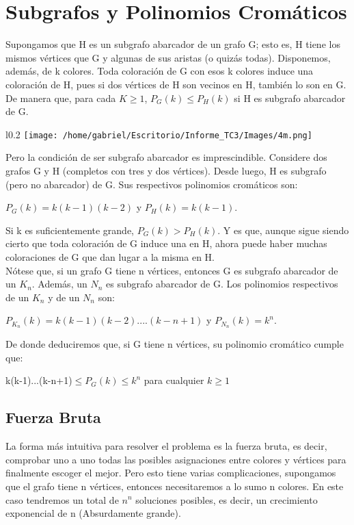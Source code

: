 \documentclass[12pt]{report}
\begin{document}
\section{Subgrafos y Polinomios Cromáticos}
Supongamos que H es un subgrafo abarcador de un grafo G; esto es, H tiene los mismos vértices que G y algunas de sus aristas (o quizás todas). Disponemos, además, de k colores. Toda coloración de G con esos k colores induce una coloración de H, pues si dos vértices de H son vecinos en H, también lo son en G. De manera que, para cada
$K \geq 1$, $P_G(k) \leq P_H(k)$ si H es subgrafo abarcador de G.\\
\begin{wrapfigure}{l}{0.2\linewidth}
    \centering
    \texttt{[image: /home/gabriel/Escritorio/Informe\_TC3/Images/4m.png]}
\end{wrapfigure}
Pero la condición de ser subgrafo abarcador es imprescindible. Considere dos grafos G y H (completos con tres y dos vértices).
Desde luego, H es subgrafo (pero no abarcador) de G. Sus respectivos polinomios cromáticos son:\\
\begin{center}
$P_G(k)=k(k-1)(k-2)$ y $P_H(k)=k(k-1).$
\end{center}
Si k es suficientemente grande, $P_G(k) > P_H(k)$. Y es que, aunque sigue siendo cierto que toda coloración de G induce una en H, ahora puede haber muchas coloraciones de G que dan lugar a la misma en H.\\
Nótese que, si un grafo G tiene n vértices, entonces G es subgrafo abarcador de un $K_n$. Además, un $N_n$ es subgrafo abarcador de G. Los polinomios respectivos de un $K_n$ y de un $N_n$ son:
\begin{center}
$P_{K_n}(k)=k(k-1)(k-2)....(k-n+1)$ y $P_{N_n}(k)=k^n.$
\end{center}
De donde deduciremos que, si G tiene n vértices, su polinomio cromático cumple que:
\begin{center}
k(k-1)...(k-n+1)$\leq P_G(k) \leq k^n$       para cualquier $k\geq1$
\end{center}
\subsection{Fuerza Bruta}
La forma más intuitiva para resolver el problema es la fuerza bruta, es decir, comprobar uno a uno todas las posibles asignaciones entre colores y vértices para finalmente escoger el mejor. Pero esto tiene varias complicaciones, supongamos que el grafo tiene n vértices, entonces necesitaremos a lo sumo n colores. En este caso tendremos un total de $n^n$ soluciones posibles, es decir, un crecimiento exponencial de n (Absurdamente grande).
\end{document}
